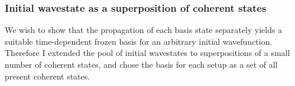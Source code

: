 \subsubsection{Initial wavestate as a superposition of coherent states}
We wish to show that the propagation of each basis state separately yields a suitable time-dependent frozen basis for an arbitrary initial wavefunction. Therefore I extended the pool of initial wavestates to superpositions of a small number of coherent states, and chose the basis for each setup as a set of all present coherent states.
